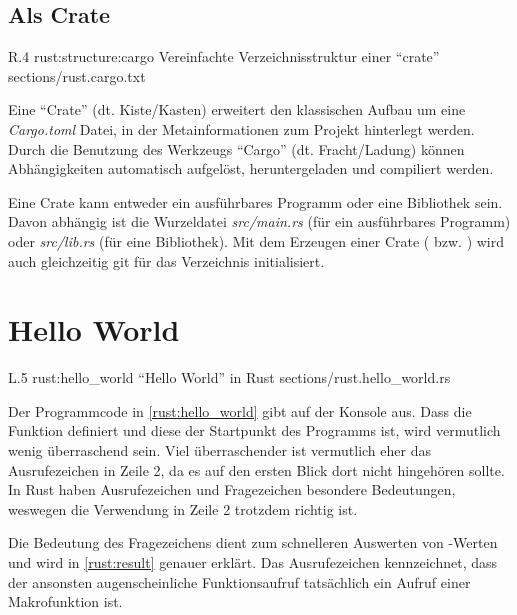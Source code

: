 \subsection{Als Crate}
\label{rust:structure:crate}

\begin{wrapfigure}{R}{.4\textwidth}
	\rustcincludeml
		{rust:structure:cargo}
		{Vereinfachte Verzeichnisstruktur einer \enquote{crate}}
		{sections/rust.cargo.txt}
\end{wrapfigure}



Eine \enquote{Crate} (dt. Kiste/Kasten) erweitert den klassischen Aufbau um eine \textit{Cargo.toml} Datei, in der Metainformationen zum Projekt hinterlegt werden.
Durch die Benutzung des Werkzeugs \enquote{Cargo} (dt. Fracht/Ladung) können Abhängigkeiten automatisch aufgelöst, heruntergeladen und compiliert werden.

Eine Crate kann entweder ein ausführbares Programm oder eine Bibliothek sein.
Davon abhängig ist die Wurzeldatei \textit{src/main.rs} (für ein ausführbares Programm) oder \textit{src/lib.rs} (für eine Bibliothek).
Mit dem Erzeugen einer Crate ( bzw. ) wird auch gleichzeitig \gls{git} für das Verzeichnis initialisiert.

\section{Hello World}


\begin{wrapfigure}{L}{.5\textwidth}
	\rustcinclude
		{rust:hello_world}
		{\enquote{Hello World} in Rust}
		{sections/rust.hello_world.rs}
\end{wrapfigure}

Der Programmcode in \autoref{rust:hello_world} gibt auf der Konsole  aus.
Dass  die Funktion  definiert und diese der Startpunkt des Programms ist, wird vermutlich wenig überraschend sein.
Viel überraschender ist vermutlich eher das Ausrufezeichen in Zeile 2, da es auf den ersten Blick dort nicht hingehören sollte.
In Rust haben Ausrufezeichen und Fragezeichen besondere Bedeutungen, weswegen die Verwendung in Zeile 2 trotzdem richtig ist.

Die Bedeutung des Fragezeichens dient zum schnelleren Auswerten von -Werten und wird in \autoref{rust:result} genauer erklärt.
Das Ausrufezeichen kennzeichnet, dass der ansonsten augenscheinliche Funktionsaufruf tatsächlich ein Aufruf einer Makrofunktion ist.

